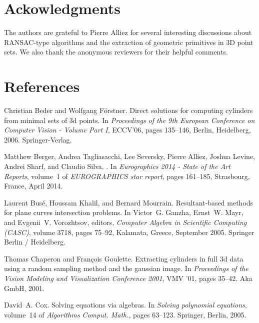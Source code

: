 \documentclass[5p]{elsarticle}
\newcommand{\com}[1]{{\color{black} #1}}
\begin{document}
\section*{Ackowledgments}

The authors are grateful to Pierre Alliez for several interesting discussions about RANSAC-type algorithms and the extraction of geometric primitives in 3D point sets. \com{We also thank the anonymous reviewers for their helpful comments}.




\section*{References}


\begin{thebibliography}{10}

Christian Beder and Wolfgang F\"{o}rstner.
\newblock Direct solutions for computing cylinders from minimal sets of 3d
  points.
\newblock In {\em Proceedings of the 9th European Conference on Computer Vision
  - Volume Part I}, ECCV'06, pages 135--146, Berlin, Heidelberg, 2006.
  Springer-Verlag.

Matthew Berger, Andrea Tagliasacchi, Lee Seversky, Pierre Alliez, Joshua
  Levine, Andrei Sharf, and Claudio Silva.
.
\newblock In {\em {Eurographics 2014 - State of the Art Reports}}, volume~1 of
  {\em EUROGRAPHICS star report}, pages 161--185, Strasbourg, France, April
  2014.

Laurent Bus{\'e}, Houssam Khalil, and Bernard Mourrain.
\newblock Resultant-based methods for plane curves intersection problems.
\newblock In Victor~G. Ganzha, Ernst~W. Mayr, and Evgenii~V. Vorozhtsov,
  editors, {\em Computer Algebra in Scientific Computing (CASC)}, volume 3718,
  pages 75--92, Kalamata, Greece, September 2005. Springer Berlin / Heidelberg.

Thomas Chaperon and Fran\c{c}ois Goulette.
\newblock Extracting cylinders in full 3d data using a random sampling method
  and the gaussian image.
\newblock In {\em Proceedings of the Vision Modeling and Visualization
  Conference 2001}, VMV '01, pages 35--42. Aka GmbH, 2001.

David~A. Cox.
\newblock Solving equations via algebras.
\newblock In {\em Solving polynomial equations}, volume~14 of {\em Algorithms
  Comput. Math.}, pages 63--123. Springer, Berlin, 2005.


\end{thebibliography}
\end{document}
